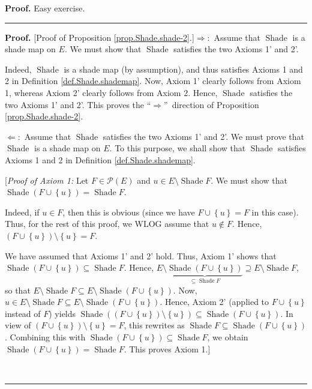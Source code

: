 \documentclass[numbers=enddot,12pt,final,onecolumn]{scrartcl}%
\newcounter{exer}
\theoremstyle{definition}
\newenvironment{proof}[1][Proof]{\noindent\textbf{#1.} }{\ \rule{0.5em}{0.5em}}
\newenvironment{verlong}{}{}
\newenvironment{vershort}{}{}
\begin{document}
\begin{vershort}
\begin{proof}
Easy exercise.
\end{proof}
\end{vershort}

\begin{verlong}
\begin{proof}
[Proof of Proposition \ref{prop.Shade.shade-2}.]$\Longrightarrow:$ Assume that
$\operatorname*{Shade}$ is a shade map on $E$. We must show that
$\operatorname*{Shade}$ satisfies the two Axioms 1' and 2'.

Indeed, $\operatorname*{Shade}$ is a shade map (by assumption), and thus
satisfies Axioms 1 and 2 in Definition \ref{def.Shade.shademap}. Now, Axiom 1'
clearly follows from Axiom 1, whereas Axiom 2' clearly follows from Axiom 2.
Hence, $\operatorname*{Shade}$ satisfies the two Axioms 1' and 2'. This proves
the \textquotedblleft$\Longrightarrow$\textquotedblright\ direction of
Proposition \ref{prop.Shade.shade-2}.

$\Longleftarrow:$ Assume that $\operatorname*{Shade}$ satisfies the two Axioms
1' and 2'. We must prove that $\operatorname*{Shade}$ is a shade map on $E$.
To this purpose, we shall show that $\operatorname*{Shade}$ satisfies Axioms 1
and 2 in Definition \ref{def.Shade.shademap}.

[\textit{Proof of Axiom 1:} Let $F\in\mathcal{P}\left(  E\right)  $ and $u\in
E\setminus\operatorname*{Shade}F$. We must show that $\operatorname*{Shade}%
\left(  F\cup\left\{  u\right\}  \right)  =\operatorname*{Shade}F$.

Indeed, if $u\in F$, then this is obvious (since we have $F\cup\left\{
u\right\}  =F$ in this case). Thus, for the rest of this proof, we WLOG assume
that $u\notin F$. Hence, $\left(  F\cup\left\{  u\right\}  \right)
\setminus\left\{  u\right\}  =F$.

We have assumed that Axioms 1' and 2' hold. Thus, Axiom 1' shows that
$\operatorname*{Shade}\left(  F\cup\left\{  u\right\}  \right)  \subseteq
\operatorname*{Shade}F$. Hence, $E\setminus\underbrace{\operatorname*{Shade}%
\left(  F\cup\left\{  u\right\}  \right)  }_{\subseteq\operatorname*{Shade}%
F}\supseteq E\setminus\operatorname*{Shade}F$, so that $E\setminus
\operatorname*{Shade}F\subseteq E\setminus\operatorname*{Shade}\left(
F\cup\left\{  u\right\}  \right)  $. Now, $u\in E\setminus
\operatorname*{Shade}F\subseteq E\setminus\operatorname*{Shade}\left(
F\cup\left\{  u\right\}  \right)  $. Hence, Axiom 2' (applied to
$F\cup\left\{  u\right\}  $ instead of $F$) yields $\operatorname*{Shade}%
\left(  \left(  F\cup\left\{  u\right\}  \right)  \setminus\left\{  u\right\}
\right)  \subseteq\operatorname*{Shade}\left(  F\cup\left\{  u\right\}
\right)  $. In view of $\left(  F\cup\left\{  u\right\}  \right)
\setminus\left\{  u\right\}  =F$, this rewrites as $\operatorname*{Shade}%
F\subseteq\operatorname*{Shade}\left(  F\cup\left\{  u\right\}  \right)  $.
Combining this with $\operatorname*{Shade}\left(  F\cup\left\{  u\right\}
\right)  \subseteq\operatorname*{Shade}F$, we obtain $\operatorname*{Shade}%
\left(  F\cup\left\{  u\right\}  \right)  =\operatorname*{Shade}F$. This
proves Axiom 1.]


\end{proof}
\end{verlong}
\end{document}
